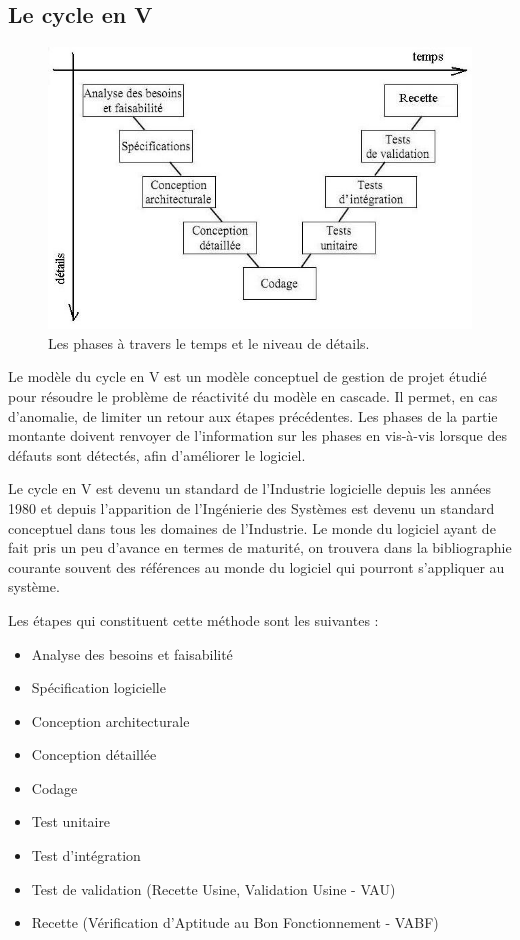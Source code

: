     \subsection{Le cycle en V}

\begin{figure}[!h]
\center
\includegraphics[width=12cm]{images/cyclev.png}
\caption{Les phases à travers le temps et le niveau de détails.}
\label{cyclev}
\end{figure}

Le modèle du cycle en V est un modèle conceptuel de gestion de projet étudié pour résoudre le problème de réactivité du modèle en cascade. Il permet, en cas d'anomalie, de limiter un retour aux étapes précédentes. Les phases  de la partie montante doivent renvoyer de l'information sur les phases en vis-à-vis lorsque des défauts sont détectés, afin d'améliorer le logiciel.

Le cycle en V est devenu un standard de l'Industrie logicielle depuis les années 1980 et depuis l'apparition de l'Ingénierie des Systèmes est devenu un standard conceptuel dans tous les domaines de l'Industrie. Le monde du logiciel ayant de fait pris un peu d'avance en termes de maturité, on trouvera dans la bibliographie courante souvent des références au monde du logiciel qui pourront s'appliquer au système.

Les étapes qui constituent cette méthode sont les suivantes :
\begin{itemize}
    \item Analyse des besoins et faisabilité
    \item Spécification logicielle
    \item Conception architecturale
    \item Conception détaillée
    \item Codage
    \item Test unitaire
    \item Test d'intégration
    \item Test de validation (Recette Usine, Validation Usine - VAU)
    \item Recette (Vérification d'Aptitude au Bon Fonctionnement - VABF)
\end{itemize}\medskip
 
